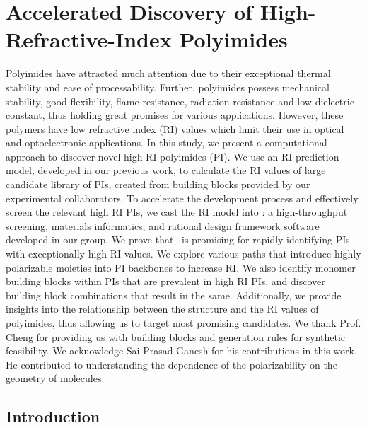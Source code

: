 \chapter{Accelerated Discovery of High-Refractive-Index Polyimides}

Polyimides have attracted much attention due to their exceptional thermal stability and ease of processability. Further, polyimides possess mechanical stability, good flexibility, flame resistance, radiation resistance and low dielectric constant, thus holding great promises for various applications.  However, these polymers have low refractive index (RI) values which limit their use in optical and optoelectronic applications. In this study, we present a computational approach to discover novel high RI polyimides (PI). We use an RI prediction model, developed in our previous work, to calculate the RI values of large candidate library of PIs, created from building blocks provided by our experimental collaborators. To accelerate the development process and effectively screen the relevant high RI PIs, we cast the RI model into \chemhtps: a high-throughput screening, materials informatics, and rational design framework software developed in our group. We prove that \chemhtps\ is promising for rapidly identifying PIs with exceptionally high RI values. We explore various paths that introduce highly polarizable moieties into PI backbones to increase RI. We also identify monomer building blocks within PIs that are prevalent in high RI PIs, and discover building block combinations that result in the same. Additionally, we provide insights into the relationship between the structure and the RI values of polyimides, thus allowing us to target most promising candidates. We thank Prof. Cheng for providing us with building blocks and generation rules for synthetic feasibility. We acknowledge Sai Prasad Ganesh for his contributions in this work. He contributed to understanding the dependence of the polarizability on the geometry of molecules.  


\section{Introduction}
\label{sec:introduction5}

